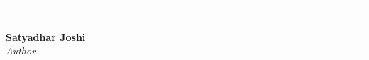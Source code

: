 \documentclass{article}
\begin{document}
	
	\noindent
	\begin{minipage}{0.5\textwidth}
		\vspace{1cm} %
		\noindent
		\rule{6cm}{0.4pt} \\ %
		\textbf{Satyadhar Joshi} \\ %
		\textit{Author} %
	\end{minipage}
	
\end{document}
